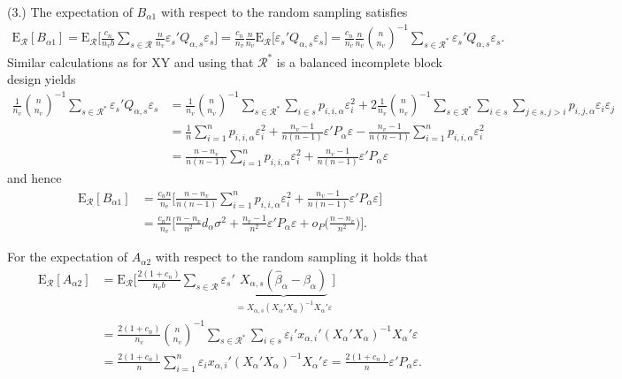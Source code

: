 \documentclass[Research_Module_ES.tex]{subfiles}
\begin{document}
(3.)
The expectation of $B_{\alpha1}$ with respect to the random sampling satisfies
\begin{align*}
\mathrm{E}_\mathcal{R}[B_{\alpha1}]= \mathrm{E}_\mathcal{R}\biggl[ \frac{c_n}{n_vb}\sum_{s\in\mathcal{R}}\frac{n}{n_v}\varepsilon_s'Q_{\alpha,s}\varepsilon_s\biggr]
=\frac{c_n}{n_v} \frac{n}{n_v} \mathrm{E}_\mathcal{R}\bigl[\varepsilon_s'Q_{\alpha,s}\varepsilon_s\bigr]
= \frac{c_n}{n_v} \frac{n}{n_v}\binom{n}{n_v}^{-1}\sum_{s\in \mathcal{R}^\ast}\varepsilon_s'Q_{\alpha,s}\varepsilon_s.
\end{align*}
Similar calculations as for XY and using that $\mathcal{R}^\ast$ is a balanced incomplete block design yields 
\begin{align*}
\frac{1}{n_v}\binom{n}{n_v}^{-1}\sum_{s\in \mathcal{R}^\ast}\varepsilon_s'Q_{\alpha,s}\varepsilon_s 
&= \frac{1}{n_v}\binom{n}{n_v}^{-1}\sum_{s\in \mathcal{R}^\ast} \sum_{i\in s} p_{i,i,\alpha}\varepsilon_i^2 
+ 2\frac{1}{n_v}\binom{n}{n_v}^{-1}\sum_{s\in \mathcal{R}^\ast} \sum_{i\in s} \sum_{j\in s, j>i} p_{i,j,\alpha}\varepsilon_i\varepsilon_j \\
&= \frac{1}{n}\sum_{i=1}^n p_{i,i,\alpha}\varepsilon_i^2 + \frac{n_v-1}{n(n-1)}\varepsilon'P_\alpha\varepsilon - \frac{n_v-1}{n(n-1)}\sum_{i=1}^n p_{i,i,\alpha}\varepsilon_i^2\\
&=\frac{n-n_v}{n(n-1)}\sum_{i=1}^n p_{i,i,\alpha}\varepsilon_i^2
+\frac{n_v-1}{n(n-1)}\varepsilon'P_\alpha\varepsilon
\end{align*}
and hence
\begin{align*}
\mathrm{E}_\mathcal{R}[B_{\alpha1}]
&=\frac{c_nn}{n_v}\biggl[\frac{n-n_v}{n(n-1)}\sum_{i=1}^n p_{i,i,\alpha}\varepsilon_i^2
+\frac{n_v-1}{n(n-1)}\varepsilon'P_\alpha\varepsilon\biggr]\\
&=\frac{c_nn}{n_v}\biggl[\frac{n-n_v}{n^2}d_\alpha\sigma^2
+\frac{n_v-1}{n^2}\varepsilon'P_\alpha\varepsilon + o_P\biggl(\frac{n-n_v}{n^2}\biggr)\biggr].
\end{align*}

For the expectation of $A_{\alpha2}$ with respect to the random sampling it holds that
\begin{align*}
\mathrm{E}_\mathcal{R}[A_{\alpha2}] 
&=\mathrm{E}_\mathcal{R}\biggl[ \frac{2(1+c_n)}{n_vb}\sum_{s\in \mathcal{R}}\varepsilon_s'\underbrace{X_{\alpha,s}(\hat{\beta}_\alpha-\beta_\alpha)}_{=X_{\alpha,s}(X_\alpha'X_\alpha)^{-1}X_\alpha'\varepsilon}\biggr]\\
&= \frac{2(1+c_n)}{n_v}\binom{n}{n_v}^{-1}\sum_{s\in\mathcal{R}^\ast}\sum_{i\in s}\varepsilon_i'x_{\alpha,i}'(X_\alpha'X_\alpha)^{-1}X_\alpha'\varepsilon\\
&= \frac{2(1+c_n)}{n} \sum_{i=1}^n\varepsilon_ix_{\alpha,i}'(X_\alpha'X_\alpha)^{-1}X_\alpha'\varepsilon
= \frac{2(1+c_n)}{n} \varepsilon'P_\alpha\varepsilon.
\end{align*}
\end{document}

